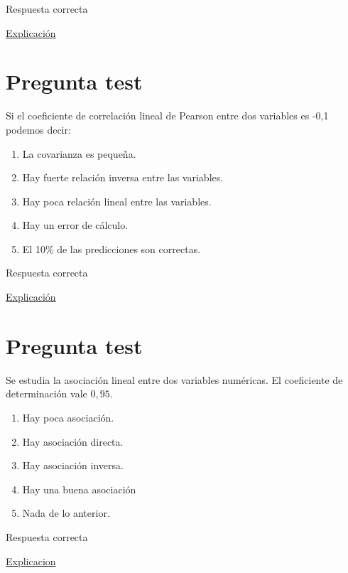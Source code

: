 \documentclass[
]{book}
\providecommand{\tightlist}{%
  \setlength{\itemsep}{0pt}\setlength{\parskip}{0pt}}
\begin{document}
Respuesta correcta

\href{https://blog.minitab.com/es/analisis-de-regresion-como-puedo-interpretar-el-r-cuadrado-y-evaluar-la-bondad-de-ajuste}{Explicación}

\hypertarget{pregunta-test-131}{%
\section{Pregunta test}\label{pregunta-test-131}}

Si el coeficiente de correlación lineal de Pearson entre dos variables es -0,1 podemos decir:

\begin{enumerate}
\def\labelenumi{\alph{enumi})}
\tightlist
\item
  La covarianza es pequeña.
\item
  Hay fuerte relación inversa entre las variables.
\item
  Hay poca relación lineal entre las variables.
\item
  Hay un error de cálculo.
\item
  El 10\% de las predicciones son correctas.
\end{enumerate}

Respuesta correcta

\href{https://1fjmanzano.github.io/bioestadistica/relaci\%C3\%B3n-entre-variables-nume\%CC\%81ricas.html\#coeficiente-de-correlacio\%CC\%81n}{Explicación}

\hypertarget{pregunta-test-132}{%
\section{Pregunta test}\label{pregunta-test-132}}

Se estudia la asociación lineal entre dos variables numéricas. El coeficiente de determinación vale \(0,95\).

\begin{enumerate}
\def\labelenumi{\alph{enumi})}
\tightlist
\item
  Hay poca asociación.
\item
  Hay asociación directa.
\item
  Hay asociación inversa.
\item
  Hay una buena asociación
\item
  Nada de lo anterior.
\end{enumerate}

Respuesta correcta

\href{https://es.wikipedia.org/wiki/Coeficiente_de_determinación}{Explicacion}
\end{document}
